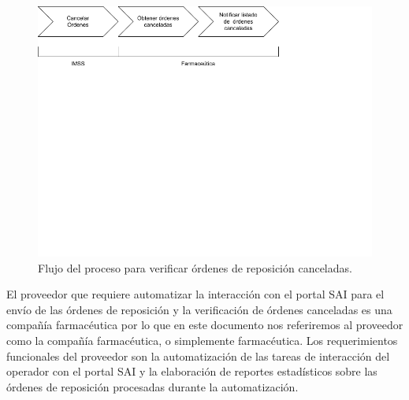 \documentclass[a4paper,10pt]{article}
\begin{document}
\begin{itemize}
\begin{figure}[h]
\includegraphics[width=\textwidth]{flujo-proceso-verificar} 
\caption{Flujo del proceso para verificar órdenes de reposición canceladas.}
\label{fig:flow-proc-verificar}
\end{figure}
\end{itemize}

El proveedor que requiere automatizar la interacción con el portal SAI para el envío de las órdenes de reposición y la verificación de órdenes canceladas es una compañía farmacéutica por lo que en este documento nos referiremos al proveedor como la compañía farmacéutica, o simplemente farmacéutica. Los requerimientos funcionales del proveedor son la automatización de las tareas de interacción del operador con el portal SAI y la elaboración de reportes estadísticos sobre las órdenes de reposición procesadas durante la automatización.
\end{document}
